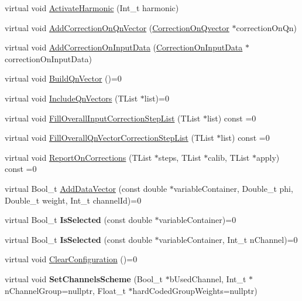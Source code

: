 \begin{DoxyCompactItemize}
\item 
virtual void \mbox{\hyperlink{classQn_1_1DetectorConfiguration_a5bb71f7e186c058cad8c6bba4f2596cd}{Activate\+Harmonic}} (Int\+\_\+t harmonic)
\item 
virtual void \mbox{\hyperlink{classQn_1_1DetectorConfiguration_a7c6c8b72521714d859c0c718cba9db5b}{Add\+Correction\+On\+Qn\+Vector}} (\mbox{\hyperlink{classQn_1_1CorrectionOnQvector}{Correction\+On\+Qvector}} $\ast$correction\+On\+Qn)
\item 
virtual void \mbox{\hyperlink{classQn_1_1DetectorConfiguration_ab65571f46d348c2b07d3b03fc1e6cf11}{Add\+Correction\+On\+Input\+Data}} (\mbox{\hyperlink{classQn_1_1CorrectionOnInputData}{Correction\+On\+Input\+Data}} $\ast$correction\+On\+Input\+Data)
\item 
virtual void \mbox{\hyperlink{classQn_1_1DetectorConfiguration_a7aaf10f6e30151dd142d59d5dff72e2d}{Build\+Qn\+Vector}} ()=0
\item 
virtual void \mbox{\hyperlink{classQn_1_1DetectorConfiguration_a4298530954cc8dabbd41b1fd83d6310f}{Include\+Qn\+Vectors}} (T\+List $\ast$list)=0
\item 
virtual void \mbox{\hyperlink{classQn_1_1DetectorConfiguration_a76e173f938b886b5575597d9464698b4}{Fill\+Overall\+Input\+Correction\+Step\+List}} (T\+List $\ast$list) const =0
\item 
virtual void \mbox{\hyperlink{classQn_1_1DetectorConfiguration_ad71d83a2b0a5cee45bde15e936843e49}{Fill\+Overall\+Qn\+Vector\+Correction\+Step\+List}} (T\+List $\ast$list) const =0
\item 
virtual void \mbox{\hyperlink{classQn_1_1DetectorConfiguration_ad33e54cbf374fa37d8edf9915719982f}{Report\+On\+Corrections}} (T\+List $\ast$steps, T\+List $\ast$calib, T\+List $\ast$apply) const =0
\item 
virtual Bool\+\_\+t \mbox{\hyperlink{classQn_1_1DetectorConfiguration_ab406e0d2a85e7f5a7c74d0bd0252375d}{Add\+Data\+Vector}} (const double $\ast$variable\+Container, Double\+\_\+t phi, Double\+\_\+t weight, Int\+\_\+t channel\+Id)=0
\item 
\mbox{\label{classQn_1_1DetectorConfiguration_a3d29b2d5f068113b03a8d620044028dc}} 
virtual Bool\+\_\+t {\bfseries Is\+Selected} (const double $\ast$variable\+Container)=0
\item 
\mbox{\label{classQn_1_1DetectorConfiguration_a41c2a9d6f9d74fc00e6bd9c9036aab9c}} 
virtual Bool\+\_\+t {\bfseries Is\+Selected} (const double $\ast$variable\+Container, Int\+\_\+t n\+Channel)=0
\item 
virtual void \mbox{\hyperlink{classQn_1_1DetectorConfiguration_a94c21b39a4a3680675319aacf4a517f4}{Clear\+Configuration}} ()=0
\item 
\mbox{\label{classQn_1_1DetectorConfiguration_aad59ea03836959a6c8287bc6112f1443}} 
virtual void {\bfseries Set\+Channels\+Scheme} (Bool\+\_\+t $\ast$b\+Used\+Channel, Int\+\_\+t $\ast$n\+Channel\+Group=nullptr, Float\+\_\+t $\ast$hard\+Coded\+Group\+Weights=nullptr)
\end{DoxyCompactItemize}
